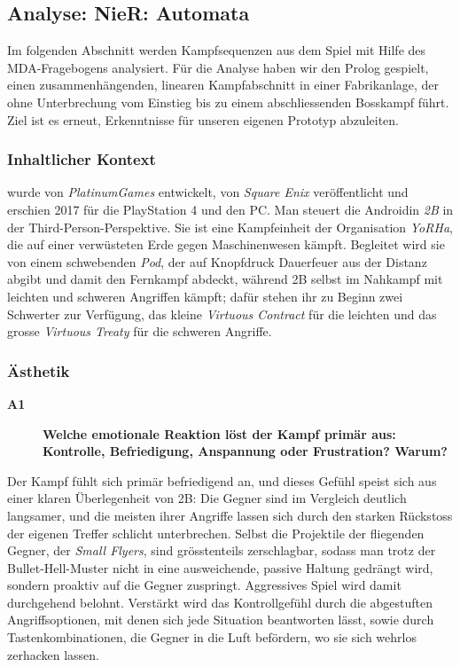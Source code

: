 \documentclass[../Main.tex]{subfiles}
\begin{document}
\subsection{Analyse: NieR: Automata} \label{sec:ReferenzspielanalyseNier}

Im folgenden Abschnitt werden Kampfsequenzen aus dem Spiel  mit Hilfe des MDA-Fragebogens analysiert. Für die Analyse haben wir den Prolog gespielt, einen zusammenhängenden, linearen Kampfabschnitt in einer Fabrikanlage, der ohne Unterbrechung vom Einstieg bis zu einem abschliessenden Bosskampf führt. Ziel ist es erneut, Erkenntnisse für unseren eigenen Prototyp abzuleiten.

\subsubsection{Inhaltlicher Kontext}

 wurde von \textit{PlatinumGames} entwickelt, von \textit{Square Enix} veröffentlicht und erschien 2017 für die PlayStation 4 und den PC.\autocite{platinumgames_nierautomata_2017} Man steuert die Androidin \textit{2B} in der Third-Person-Perspektive. Sie ist eine Kampfeinheit der Organisation \textit{YoRHa}, die auf einer verwüsteten Erde gegen Maschinenwesen kämpft. Begleitet wird sie von einem schwebenden \textit{Pod}, der auf Knopfdruck Dauerfeuer aus der Distanz abgibt und damit den Fernkampf abdeckt, während 2B selbst im Nahkampf mit leichten und schweren Angriffen kämpft; dafür stehen ihr zu Beginn zwei Schwerter zur Verfügung, das kleine \textit{Virtuous Contract} für die leichten und das grosse \textit{Virtuous Treaty} für die schweren Angriffe.

\subsubsection{Ästhetik}

\begin{description}
    \item[\textbf{A1}] \textbf{Welche emotionale Reaktion löst der Kampf primär aus: Kontrolle, Befriedigung, Anspannung oder Frustration? Warum?}
\end{description}

Der Kampf fühlt sich primär befriedigend an, und dieses Gefühl speist sich aus einer klaren Überlegenheit von 2B: Die Gegner sind im Vergleich deutlich langsamer, und die meisten ihrer Angriffe lassen sich durch den starken Rückstoss der eigenen Treffer schlicht unterbrechen. Selbst die Projektile der fliegenden Gegner, der \textit{Small Flyers}, sind grösstenteils zerschlagbar, sodass man trotz der Bullet-Hell-Muster nicht in eine ausweichende, passive Haltung gedrängt wird, sondern proaktiv auf die Gegner zuspringt. Aggressives Spiel wird damit durchgehend belohnt. Verstärkt wird das Kontrollgefühl durch die abgestuften Angriffsoptionen, mit denen sich jede Situation beantworten lässt, sowie durch Tastenkombinationen, die Gegner in die Luft befördern, wo sie sich wehrlos zerhacken lassen.
\end{document}
